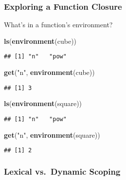 \documentclass[
]{article}
\newenvironment{Shaded}{\begin{snugshade}}{\end{snugshade}}
\newcommand{\FunctionTok}[1]{\textcolor[rgb]{0.13,0.29,0.53}{\textbf{#1}}}
\newcommand{\NormalTok}[1]{#1}
\newcommand{\StringTok}[1]{\textcolor[rgb]{0.31,0.60,0.02}{#1}}
\begin{document}
\hypertarget{exploring-a-function-closure}{%
\subsubsection{Exploring a Function
Closure}\label{exploring-a-function-closure}}

What's in a function's environment?

\begin{Shaded}
\begin{Highlighting}[]
\FunctionTok{ls}\NormalTok{(}\FunctionTok{environment}\NormalTok{(cube))}
\end{Highlighting}
\end{Shaded}

\begin{verbatim}
## [1] "n"   "pow"
\end{verbatim}

\begin{Shaded}
\begin{Highlighting}[]
\FunctionTok{get}\NormalTok{(}\StringTok{"n"}\NormalTok{, }\FunctionTok{environment}\NormalTok{(cube))}
\end{Highlighting}
\end{Shaded}

\begin{verbatim}
## [1] 3
\end{verbatim}

\begin{Shaded}
\begin{Highlighting}[]
\FunctionTok{ls}\NormalTok{(}\FunctionTok{environment}\NormalTok{(square))}
\end{Highlighting}
\end{Shaded}

\begin{verbatim}
## [1] "n"   "pow"
\end{verbatim}

\begin{Shaded}
\begin{Highlighting}[]
\FunctionTok{get}\NormalTok{(}\StringTok{"n"}\NormalTok{, }\FunctionTok{environment}\NormalTok{(square))}
\end{Highlighting}
\end{Shaded}

\begin{verbatim}
## [1] 2
\end{verbatim}

\hypertarget{lexical-vs.-dynamic-scoping}{%
\subsubsection{Lexical vs.~Dynamic
Scoping}\label{lexical-vs.-dynamic-scoping}}
\end{document}
